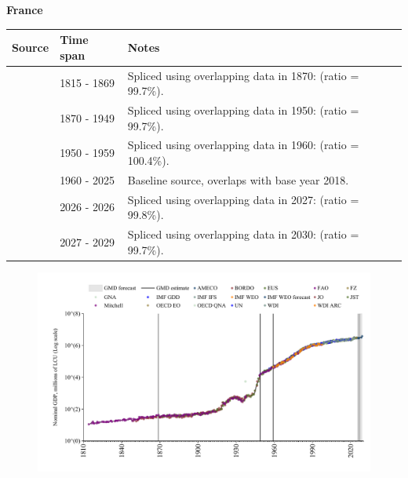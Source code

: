 \documentclass[12pt,a4paper,landscape]{article}
\begin{document}
\begin{adjustbox}{max totalsize={\paperwidth}{\paperheight},center}
\begin{minipage}[t][\textheight][t]{\textwidth}
\vspace*{0.5cm}
{}
\begin{center}
{\Large\bfseries France}
\end{center}
\vspace{0.5cm}
\begin{table}[H]
\centering
\small
\begin{tabular}{|l|l|l|}
\hline
\textbf{Source} & \textbf{Time span} & \textbf{Notes} \\
\hline
\rowcolor{white}\cite{Mitchell}& 1815 - 1869 &Spliced using overlapping data in 1870: (ratio = 99.7\%).\\
\rowcolor{lightgray}\cite{JST}& 1870 - 1949 &Spliced using overlapping data in 1950: (ratio = 99.7\%).\\
\rowcolor{white}\cite{IMF_IFS}& 1950 - 1959 &Spliced using overlapping data in 1960: (ratio = 100.4\%).\\
\rowcolor{lightgray}\cite{OECD_EO}& 1960 - 2025 &Baseline source, overlaps with base year 2018.\\
\rowcolor{white}\cite{AMECO}& 2026 - 2026 &Spliced using overlapping data in 2027: (ratio = 99.8\%).\\
\rowcolor{lightgray}\cite{IMF_WEO_forecast}& 2027 - 2029 &Spliced using overlapping data in 2030: (ratio = 99.7\%).\\
\hline
\end{tabular}
\end{table}
\begin{figure}[H]
\centering
\includegraphics[width=\textwidth,height=0.6\textheight,keepaspectratio]{graphs/FRA_nGDP.pdf}
\end{figure}
\end{minipage}
\end{adjustbox}
\end{document}
